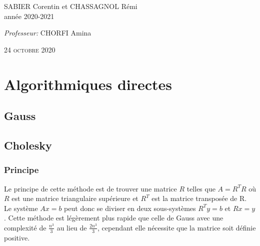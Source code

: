 \documentclass[a4paper]{article}
\begin{document}
\begin{titlepage}
\begin{center}
    \begin{minipage}{0.9\textwidth}
      \begin{flushleft} \large
        SABIER Corentin et CHASSAGNOL Rémi\\
        année 2020-2021\\[2cm]
      \end{flushleft}
    \end{minipage}

    \begin{minipage}{0.9\textwidth}
      \begin{flushright} \large
        \emph{Professeur:} CHORFI Amina\\
      \end{flushright}
    \end{minipage}

    \textsc{24 octobre 2020}

  \end{center}
\end{titlepage}

\clearpage

\tableofcontents

\clearpage

\section{Algorithmiques directes}

\subsection{Gauss}

\subsection{Cholesky}

\subsubsection{Principe}

Le principe de cette méthode est de trouver une matrice $R$ telles que $A =
R^{T}R$ où $R$ est une matrice triangulaire supérieure et $R^{T}$ est la matrice
transposée de R. Le système $Ax = b$ peut donc se diviser en deux sous-systèmes
$R^{T}y = b$ et $Rx = y$. Cette méthode est légèrement plus rapide que celle de
Gauss avec une complexité de $\frac{n^{3}}{3}$ au lieu de $\frac{2n^{3}}{3}$,
cependant elle nécessite que la matrice soit définie positive.
\end{document}

